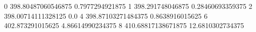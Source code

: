 0 398.80487060546875 0.7977294921875
1 398.291748046875 0.28460693359375
2 398.00714111328125 0.0
4 398.87103271484375 0.8638916015625
6 402.873291015625 4.86614990234375
8 410.68817138671875 12.6810302734375
